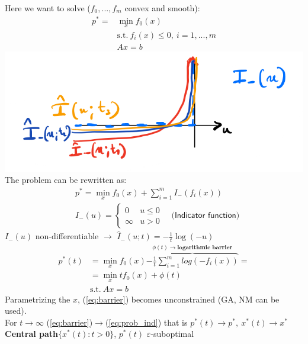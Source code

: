 \documentclass[a4paper]{article}
\begin{document}
\begin{multicols}{2}
    \noindent
    Here we want to solve ($f_0, ..., f_m$ convex and smooth): 
    \vspace{-0.2cm}
    \begin{align*}
        p^*=&\min_{x}  f_0(x)\\
        &\text{s.t.} \ f_i(x)\le0, \ i=1,...,m\\
        &Ax=b 
    \end{align*}
    \includegraphics[scale=0.4]{img/barrier.png}\\
    The problem can be rewritten as: 
    \vspace{-0.3cm}
    \begin{align}
        &p^*=\min_{x} f_0(x)+\sum_{i=1}^{m} {I_{-}(f_i(x))}\label{eq:prob_ind}\\ 
        &I_{-}(u)=\begin{cases}
            0&{u}\le0\\
            \infty&u>0
        \end{cases} \quad \textsf{(Indicator function)}
    \end{align}
    \vspace{-0.3cm}
    $I_{-}(u)$ non-differentiable $\to$ ${\hat{I}_{-}(u;t)=-\frac{1}{t}\log(-u)}$
    \begin{align}
        p^*(t)&=\min_{x} f_0(x)\overbrace{-\frac{1}{t}\sum_{i=1}^{m} {log(-f_i(x))}}^{\phi(t) \to \textbf{logarithmic barrier}}=\\
        &=\min_{x} {t{f_0(x)}+\phi(t)}\label{eq:barrier} \\ 
        &\text{s.t.} \ Ax=b
    \end{align}
    Parametrizing the $x$, (\ref{eq:barrier}) becomes unconstrained (GA, NM can be used).\\
    \noindent
    For $t\to\infty$ (\ref{eq:barrier})$\to$(\ref{eq:prob_ind}) that is
    $p^*(t)\to{p^*}, \
        x^*(t)\to{x^*}$\\
    \textbf{Central path}$\{x^*(t):t>0\}$, $p^*(t)$ $\varepsilon$-suboptimal

\end{multicols}
\end{document}
